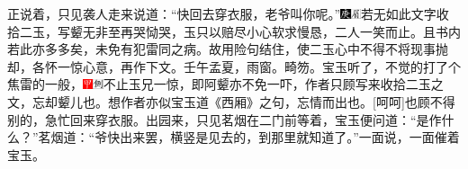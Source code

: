 正说着，只见袭人走来说道：``快回去穿衣服，老爷叫你呢。''{\includegraphics[width=3mm]{../Images/00004}\includegraphics[width=3mm]{../Images/00010}\footnotesize \kaishu 若无如此文字收拾二玉，写颦无非至再哭恸哭，玉只以赔尽小心软求慢恳，二人一笑而止。且书内若此亦多多矣，未免有犯雷同之病。故用险句结住，使二玉心中不得不将现事抛却，各怀一惊心意，再作下文。壬午孟夏，雨窗。畸笏。}宝玉听了，不觉的打了个焦雷的一般，{\includegraphics[width=3mm]{../Images/00002}\includegraphics[width=3mm]{../Images/00011}\footnotesize \kaishu 不止玉兄一惊，即阿颦亦不免一吓，作者只顾写来收拾二玉之文，忘却颦儿也。想作者亦似宝玉道《西厢》之句，忘情而出也。{[}呵呵{]}}也顾不得别的，急忙回来穿衣服。出园来，只见茗烟在二门前等着，宝玉便问道：``是作什么？''茗烟道：``爷快出来罢，横竖是见去的，到那里就知道了。''一面说，一面催着宝玉。


